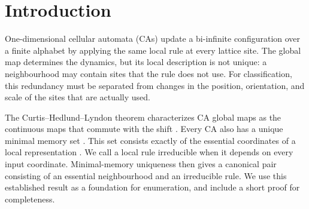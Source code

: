 \documentclass[11pt,a4paper]{article}
\newenvironment{revision}{\color{blue}}{}
\newenvironment{revision}{\color{black}}{}
\newcommand{\locmark}[1]{\label{#1}\linelabel{line:#1}}
\begin{document}
\begin{revision}
\begin{abstract}
We count geometric equivalence classes of one-dimensional cellular automata
by combining irreducible local rules with the geometry of their essential
neighbourhoods. Using the standard uniqueness of minimal memory sets, we
derive recurrences for the stabilizer types of irreducible binary rules and
enumerate global maps under state permutations, reflection, and
postcomposition by shifts. Asymmetric essential neighbourhoods require an
additional orientation term in the counting formula. We define rational
neighbourhood scaling intrinsically as a partial operation, prove that the
resulting similarity relation is an equivalence relation, and describe integer
scaling as conjugacy to a product of independent copies. For binary rules on
three- and four-site intervals, the congruence counts are respectively
85 and 16\,656; allowing scaling gives 81 and 16\,648. These counts are also
verified by exhaustive enumeration. On the finite set of elementary cellular
automata, the join of similarity and topological conjugacy has 76 classes.
\end{abstract}

\section{Introduction}
\locmark{loc:introduction}
One-dimensional cellular automata (CAs) update a bi-infinite configuration
over a finite alphabet by applying the same local rule at every lattice site.
The global map determines the dynamics, but its local description is not
unique: a neighbourhood may contain sites that the rule does not use.
For classification, this redundancy must be separated from changes in the
position, orientation, and scale of the sites that are actually used.

The Curtis--Hedlund--Lyndon theorem characterizes CA global maps as the
continuous maps that commute with the shift
\cite{DBLP:journals/mst/Hedlund69,Lind_Marcus_1995}.
Every CA also has a unique minimal memory set
\cite[Section~1.5]{CeccheriniCoornaert2010}. This set consists exactly of
the essential coordinates of a local representation
\cite[Proposition~1]{CastilloVeliz2024}.
We call a local rule irreducible when it depends on every input coordinate.
Minimal-memory uniqueness then gives a canonical pair consisting of an
essential neighbourhood and an irreducible rule. We use this established
result as a foundation for enumeration, and include a short proof for
completeness.


\end{revision}
\end{document}
